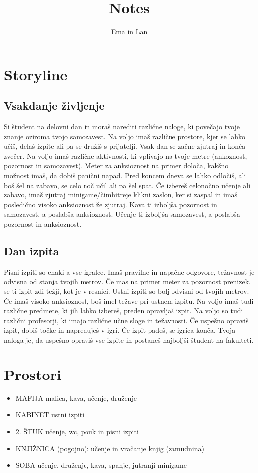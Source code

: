 \documentclass[a4paper]{article}
\begin{document}
\title{Notes}
\author{Ema in Lan}
\date{}
\maketitle

\section{Storyline}
\subsection*{Vsakdanje življenje}
Si študent na delovni dan in moraš narediti različne naloge, ki povečajo tvoje znanje oziroma tvojo samozavest. Na voljo imaš različne prostore, kjer se lahko učiš, delaš izpite ali pa se družiš s prijatelji. Vsak dan se začne zjutraj in konča zvečer. Na voljo imaš različne aktivnosti, ki vplivajo na tvoje metre (ankoznost, pozornost in samozavest). Meter za anksioznost na primer določa, kakšno možnost imaš, da dobiš panični napad. Pred koncem dneva se lahko odločiš, ali boš šel na zabavo, se celo noč učil ali pa šel spat. Če izbereš celonočno učenje ali zabavo, imaš zjutraj minigame/čimhitreje klikni zaslon, ker si zaspal in imaš posledično visoko anksioznost že zjutraj. Kava ti izboljša pozornost in samozavest, a poslabša anksioznost. Učenje ti izboljša samozavest, a poslabša pozornost in anksioznost.

\subsection*{Dan izpita}
Pisni izpiti so enaki a vse igralce. Imaš pravilne in napačne odgovore, težavnost je odvisna od stanja tvojih metrov. Če mas na primer meter za pozornost prenizek, se ti izpit zdi težji, kot je v resnici. Ustni izpiti so bolj odvisni od tvojih metrov. Če imaš visoko anksioznost, boš imel težave pri ustnem izpitu. Na voljo imaš tudi različne predmete, ki jih lahko izbereš, preden opravljaš izpit. Na voljo so tudi različni profesorji, ki imajo različne učne sloge in težavnosti. Če uspešno opraviš izpit, dobiš točke in napreduješ v igri. Če izpit padeš, se igrica konča. Tvoja naloga je, da uspešno opraviš vse izpite in postaneš najboljši študent na fakulteti.

\section{Prostori}
\begin{itemize}
    \item MAFIJA\: malica, kava, učenje, druženje
    \item KABINET\: ustni izpiti
    \item 2. ŠTUK\: učenje, wc, pouk in pisni izpiti 
    \item KNJIŽNICA (pogojno): učenje in vračanje knjig (zamudnina)
    \item SOBA\: učenje, druženje, kava, spanje, jutranji minigame
\end{itemize}
\end{document}
